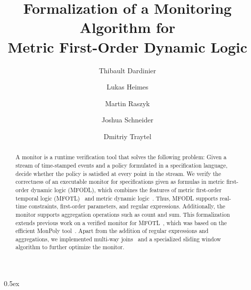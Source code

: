 \documentclass[10pt,a4paper]{article}
\begin{document}
\title{Formalization of a Monitoring Algorithm for\\ Metric First-Order Dynamic Logic}
\author{Thibault Dardinier \and Lukas Heimes \and Martin Raszyk \and Joshua Schneider \and Dmitriy Traytel}

\maketitle

\begin{abstract}
A monitor is a runtime verification tool that solves the following problem: Given a stream
of time-stamped events and a policy formulated in a specification language, decide
whether the policy is satisfied at every point in the stream. We verify the correctness
of an executable monitor for specifications given as formulas in metric first-order
dynamic logic (MFODL), which combines the features of metric first-order temporal logic
(MFOTL)~\cite{BasinKMZ-JACM15} and metric dynamic logic~\cite{BasinKT-RV17}. Thus, MFODL
supports real-time constraints, first-order parameters, and regular expressions.
Additionally, the monitor supports aggregation operations such as count and sum.
This formalization extends previous work on a verified monitor for
MFOTL~\cite{SchneiderBKT2019RV}, which was based on the efficient MonPoly
tool~\cite{monpoly}. Apart from the addition of regular expressions and aggregations, we
implemented multi-way joins~\cite{Dardinier2019AFP} and a specialized sliding window
algorithm to further optimize the monitor.
\end{abstract}

\tableofcontents

\parindent 0pt\parskip 0.5ex





\end{document}
